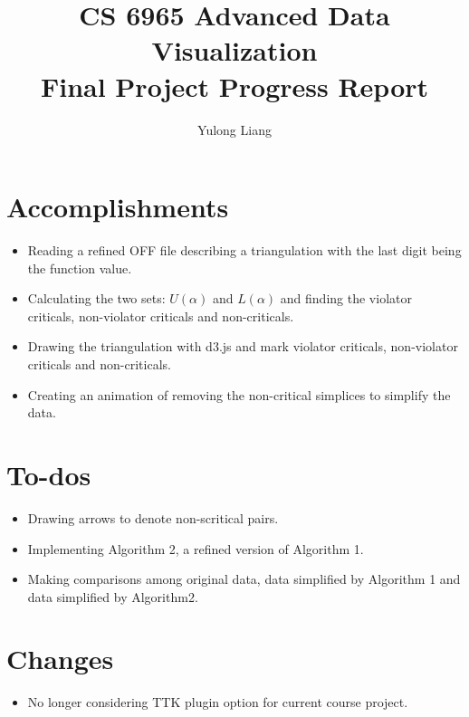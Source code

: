 \documentclass[12pt]{article}
\begin{document}
\title{CS 6965 Advanced Data Visualization\\{\bf Final Project Progress Report}}
\author{Yulong Liang}
\maketitle

\section{Accomplishments}
\begin{itemize}
\item Reading a refined OFF file describing a triangulation with the last digit being the function value.
\item Calculating the two sets: $U(\alpha)$ and $L(\alpha)$ and finding the violator criticals, non-violator criticals and non-criticals.
\item Drawing the triangulation with d3.js and mark violator criticals, non-violator criticals and non-criticals.
\item Creating an animation of removing the non-critical simplices to simplify the data.
\end{itemize}

\section{To-dos}
\begin{itemize}
\item Drawing arrows to denote non-scritical pairs.
\item Implementing Algorithm 2, a refined version of Algorithm 1.
\item Making comparisons among original data, data simplified by Algorithm 1 and data simplified by Algorithm2.
\end{itemize}

\section{Changes}
\begin{itemize}
\item No longer considering TTK plugin option for current course project.
\end{itemize}
\end{document}
